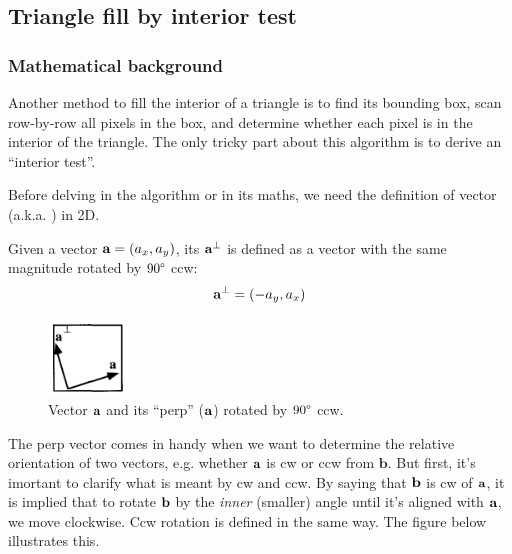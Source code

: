 \documentclass[a4paper]{article}
\begin{document}



\subsection{Triangle fill by interior test}


\subsubsection{Mathematical background}
Another method to fill the interior of a triangle is to find its bounding box, scan row-by-row all pixels in the box, and determine whether each pixel is in the interior of the triangle. The only tricky part about this algorithm is to derive an ``interior test''.

Before delving in the algorithm or in its maths, we need the definition of  vector (a.k.a. ) in 2D.
\begin{definition}
Given a vector $\textbf{a} = (a_x, a_y)$, its  $\textbf{a}^{\bot}$ is defined as a vector with the same magnitude rotated by $90\degree$ ccw:
\begin{equation}
\textbf{a}^{\bot} = (-a_y, a_x)
\end{equation}
\end{definition}
\begin{figure}[H]
    \centering
    \includegraphics[height=2cm]{img/vec_perp.png}
    \caption{Vector $\textbf{a}$ and its ``perp'' ($\textbf{a}$) rotated by $90\degree$ ccw.}
\end{figure}

The perp vector comes in handy when we want to determine the relative orientation of two vectors, e.g. whether $\textbf{a}$ is cw or ccw from $\textbf{b}$. But first, it's imortant to clarify what is meant by cw and ccw. By saying that $\textbf{b}$ is cw of $\textbf{a}$, it is implied that to rotate $\textbf{b}$ by the \textit{inner} (smaller) angle until it's aligned with $\textbf{a}$, we move clockwise. Ccw rotation is defined in the same way. The figure below illustrates this.
\end{document}
